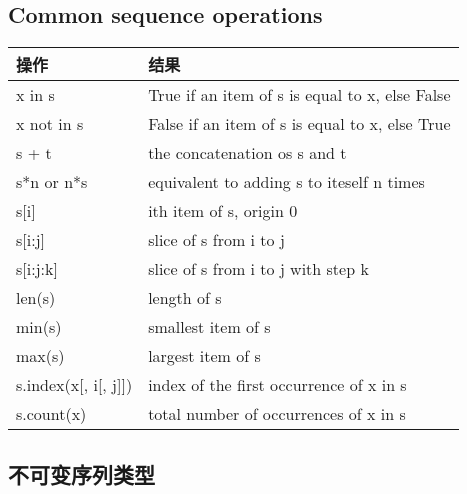 \subsection{Common sequence operations}
\begin{center}
\begin{tabular}{|l|l|}\hline
操作                &               结果 \\\hline
x in s              &               True if an item of s is equal to x, else False \\\hline
x not in s          &               False if an item of s is equal to x, else True \\\hline
s + t               &               the concatenation os s and t \\\hline
s*n or n*s          &               equivalent to adding s to iteself n times \\\hline
s[i]                &               ith item of s, origin 0 \\\hline
s[i:j]              &               slice of s from i to j \\\hline
s[i:j:k]            &               slice of s from i to j with step k \\\hline
len(s)              &               length of s \\\hline
min(s)              &               smallest item of s \\\hline
max(s)              &               largest item of s \\\hline
s.index(x[, i[, j]])&               index of the first occurrence of x in s\\\hline
s.count(x)          &               total number of occurrences of x in s \\\hline
\end{tabular}
\end{center}

\subsection{不可变序列类型}



